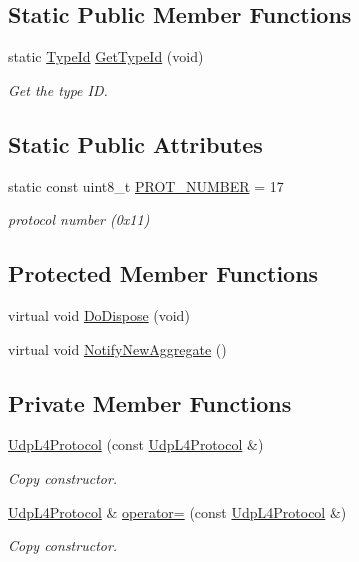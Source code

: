 \subsection*{Static Public Member Functions}
\begin{DoxyCompactItemize}
\item 
static \hyperlink{classns3_1_1TypeId}{Type\+Id} \hyperlink{classns3_1_1UdpL4Protocol_a3634aa5ca6a9beb59b4b9f451411be75}{Get\+Type\+Id} (void)
\begin{DoxyCompactList}\small\item\em Get the type ID. \end{DoxyCompactList}\end{DoxyCompactItemize}
\subsection*{Static Public Attributes}
\begin{DoxyCompactItemize}
\item 
static const uint8\+\_\+t \hyperlink{classns3_1_1UdpL4Protocol_ad370801b3d1a166e831020a777c41047}{P\+R\+O\+T\+\_\+\+N\+U\+M\+B\+ER} = 17
\begin{DoxyCompactList}\small\item\em protocol number (0x11) \end{DoxyCompactList}\end{DoxyCompactItemize}
\subsection*{Protected Member Functions}
\begin{DoxyCompactItemize}
\item 
virtual void \hyperlink{classns3_1_1UdpL4Protocol_ac65581352483fff231c47521455b9ce9}{Do\+Dispose} (void)
\item 
virtual void \hyperlink{classns3_1_1UdpL4Protocol_aab4a2c28a2caeb37eaec4a23a920b339}{Notify\+New\+Aggregate} ()
\end{DoxyCompactItemize}
\subsection*{Private Member Functions}
\begin{DoxyCompactItemize}
\item 
\hyperlink{classns3_1_1UdpL4Protocol_ae70d6a90aaadcdae005640fe4eaba2d4}{Udp\+L4\+Protocol} (const \hyperlink{classns3_1_1UdpL4Protocol}{Udp\+L4\+Protocol} \&)
\begin{DoxyCompactList}\small\item\em Copy constructor. \end{DoxyCompactList}\item 
\hyperlink{classns3_1_1UdpL4Protocol}{Udp\+L4\+Protocol} \& \hyperlink{classns3_1_1UdpL4Protocol_a6a3b224673532aacfd1f2d65d086fae0}{operator=} (const \hyperlink{classns3_1_1UdpL4Protocol}{Udp\+L4\+Protocol} \&)
\begin{DoxyCompactList}\small\item\em Copy constructor. \end{DoxyCompactList}\end{DoxyCompactItemize}
